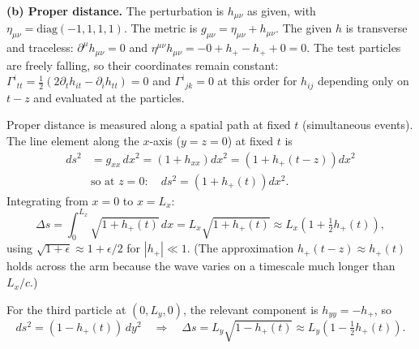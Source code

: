 \documentclass[12pt]{article}
\newcommand{\be}{\begin{equation}}
\newcommand{\ee}{\end{equation}}
\begin{document}
\textbf{(b) Proper distance.} The perturbation is $h_{\mu\nu}$ as given, with $\eta_{\mu\nu} = \mathrm{diag}(-1,1,1,1)$. The metric is $g_{\mu\nu} = \eta_{\mu\nu} + h_{\mu\nu}$. The given $h$ is transverse and traceless: $\partial^\mu h_{\mu\nu}=0$ and $\eta^{\mu\nu}h_{\mu\nu} = -0 + h_+ - h_+ + 0 = 0$. The test particles are freely falling, so their coordinates remain constant: $\Gamma^i{}_{tt} = \tfrac12(2\partial_t h_{it} - \partial_i h_{tt}) = 0$ and $\Gamma^i{}_{jk}=0$ at this order for $h_{ij}$ depending only on $t-z$ and evaluated at the particles.

Proper distance is measured along a spatial path at fixed $t$ (simultaneous events). The line element along the $x$-axis ($y=z=0$) at fixed $t$ is
\begin{align*}
ds^2 &= g_{xx}\,dx^2 = \left(1 + h_{xx}\right)dx^2 = \left(1 + h_+(t-z)\right)dx^2 \\
&\text{so at } z=0:\quad ds^2 = \left(1+h_+(t)\right)dx^2.
\end{align*}
Integrating from $x=0$ to $x=L_x$:
\be
\Delta s = \int_0^{L_x}\sqrt{1+h_+(t)}\,dx = L_x\sqrt{1+h_+(t)} \approx L_x\left(1+\tfrac12 h_+(t)\right),
\ee
using $\sqrt{1+\epsilon}\approx 1+\epsilon/2$ for $|h_+|\ll 1$. (The approximation $h_+(t-z)\approx h_+(t)$ holds across the arm because the wave varies on a timescale much longer than $L_x/c$.)

For the third particle at $(0,L_y,0)$, the relevant component is $h_{yy} = -h_+$, so
\be
ds^2 = (1 - h_+(t))\,dy^2 \quad\Longrightarrow\quad \Delta s = L_y\sqrt{1-h_+(t)} \approx L_y\left(1-\tfrac12 h_+(t)\right).
\ee
\end{document}
